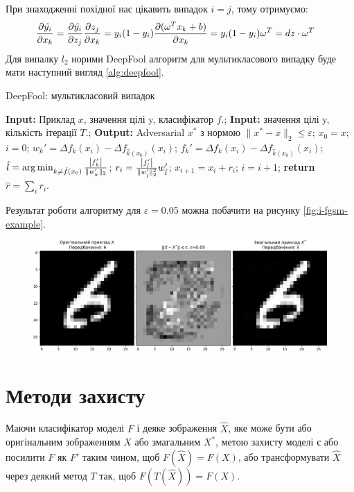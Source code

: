 \documentclass[a4paper,14pt]{extreport}
\renewcommand{\algorithmicrequire}{\textbf{Input: }}
\renewcommand{\algorithmicensure}{\textbf{Output: }}
\newcommand{\algorithmreturn}{\textbf{return }}
\newcommand{\tran}{^{T}}
\begin{document}
	При знаходженні похідної нас цікавить випадок $i = j$, тому отримуємо:
	\begin{align*}
	\pdv{\hat{y_i}}{x_k} 
	&=
	\pdv{\hat{y_i}}{z_j} \pdv{z_j}{x_k} 
	=
	y_i(1-y_i) \pdv{(\omega\tran x_k + b)}{x_k} 
	=
	y_i(1-y_i) \omega\tran 
	=
	dz \cdot \omega\tran
	\end{align*}
	Для випалку $l_2$ норими DeepFool алгоритм для мультикласового випадку буде мати наступний вигляд \ref{alg:deepfool}.
	\begin{algorithm}
		\caption{DeepFool: мультикласовий випадок}
		\label{alg:deepfool}
		\begin{algorithmic}[1]
			\State \algorithmicrequire{Приклад $x$, значення цілі y, класифікатор $f$.};
			\State \algorithmicrequire{значення цілі y, кількість ітерації $T$.};
			\State \algorithmicensure{ Adversarial $x^{*}$ з нормою $\|x^{*} - x\|_{2} \leq \varepsilon $};
			\State $x_0 = x$; $i = 0$; 
					\State $ w_{k}' = \Delta f_k(x_i) - \Delta f_{\hat{k}(x_0)} (x_i)$;
					\State $ f_{k}' = \Delta f_k(x_i) - \Delta f_{\hat{k}(x_0)} (x_i)$;
				\EndFor
				\State $\hat{l} = \arg \min_{k \neq \hat{f}(x_0)} \frac{\abs{f_{k}'}}{\|w_{k}'\|_2}$;
				\State $r_i = \frac{\abs{f_{\hat{l}}'}}{\|w_{\hat{l}}'\|_{2}^{2}} w_{\hat{l}}'$;
				\State $x_{i+1} = x_i + r_i$;
				\State $i = i + 1$;
			\EndWhile
			\State \algorithmreturn{$\hat{r} = \sum_{i} r_i $}.
		\end{algorithmic}
	\end{algorithm}			
	Результат роботи алгоритму для $\varepsilon = 0.05$ можна побачити на рисунку \ref{fig:i-fgsm-example}.
	\begin{figure}[h]
		\centering
		\includegraphics[width=1\textwidth]{resources/deepfool-example.pdf}
		\caption{}
		\label{fig:deepfool-example}
	\end{figure}
	
	\chapter{Методи захисту}
	Маючи класифікатор моделі $F$ і деяке зображення $\hat{X}$, яке може бути або оригінальним зображенням $X$ або змагальним $X^{*}$, метою захисту моделі є або посилити $F$ як $F'$ таким чином, щоб $F(\hat{X}) = F(X)$, або трансформувати $\hat{X}$ через деякий метод $T$ так, щоб $F(T(\hat{X})) = F(X)$.
	
\end{document}
